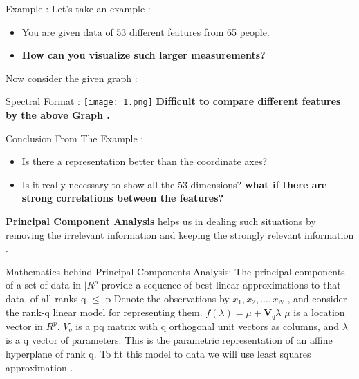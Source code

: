 \documentclass{beamer}
\begin{document}
\begin{frame}{Example :}
Let's take an example :
\newline
\begin{itemize}
\item You are given data of 53 different features from 65 people.
\newline
\item \textbf{How can you visualize such larger measurements?}
\newline
\newline
\end{itemize}
Now consider the given graph : 
\end{frame}
\begin{frame}{Spectral Format :}
\centering
    \texttt{[image: 1.png]}
\newline    
\textbf{Difficult to compare different features by the above Graph .}    
\end{frame}{}
\begin{frame}{Conclusion From The Example :}
\begin{itemize}
\item Is there a representation better than the coordinate axes?
\newline
\item Is it really necessary to show all the 53 dimensions?
\textbf{what if there are strong correlations between the
features?}
\newline
\newline
\end{itemize}
\textbf{Principal Component Analysis} helps us in dealing such situations by removing the irrelevant information and keeping the strongly relevant information .
\end{frame}
\begin{frame}{Mathematics behind Principal Components Analysis:}
The principal components of a set of data in $|R^p$
provide a sequence of best
linear approximations to that data, of all ranks \newline q $\leq$ p
\newline
Denote the observations by $x_1,x_2,... ,x_N$ , and consider the rank-q linear
model for representing them. \newline
$f(\lambda) = \mu + \textbf{V}_q\lambda $ \newline
$\mu$ is a location vector in $R^p$.\newline
$V_q$ is a p\cross q matrix with q orthogonal
unit vectors as columns, and $\lambda$ is a q vector of parameters. This is the
parametric representation of an affine hyperplane of rank q.\newline
To fit this model to data we will use least squares approximation .

\end{frame}
\end{document}
